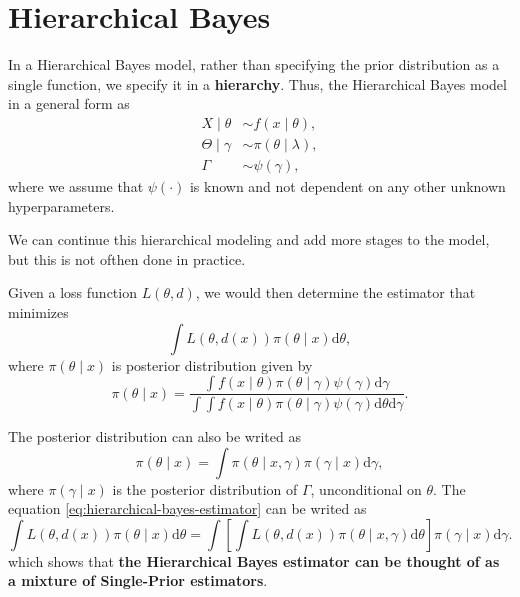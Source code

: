 \section{Hierarchical Bayes}

In a Hierarchical Bayes model, rather than specifying the prior distribution as a single function, we specify it in a \textbf{hierarchy}. Thus, the Hierarchical Bayes model in a general form as
\begin{equation}
    \begin{aligned}
        X\mid\theta      & \sim f\left(x\mid\theta\right),         \\
        \Theta\mid\gamma & \sim \pi\left(\theta\mid\lambda\right), \\
        \Gamma           & \sim \psi\left(\gamma\right),
    \end{aligned}
    \label{eq:hierarchical-bayes}
\end{equation}
where we assume that $\psi\left(\cdot\right)$ is known and not dependent on any other unknown hyperparameters.

\begin{remark}
    We can continue this hierarchical modeling and add more stages to the model, but this is not ofthen done in practice.
\end{remark}

Given a loss function $L\left(\theta,d\right)$, we would then determine the estimator that minimizes
\begin{equation} \label{eq:hierarchical-bayes-estimator}
    \int L\left(\theta,d\left(x\right)\right)\pi\left(\theta\mid x\right)\mathrm{d}\theta,
\end{equation}
where $\pi\left(\theta\mid x\right)$ is posterior distribution given by
\begin{equation*}
    \pi\left(\theta\mid x\right)=\frac{\int f\left(x\mid\theta\right)\pi\left(\theta\mid\gamma\right)\psi\left(\gamma\right)\mathrm{d}\gamma}{\int\int f\left(x\mid\theta\right)\pi\left(\theta\mid\gamma\right)\psi\left(\gamma\right)\mathrm{d}\theta\mathrm{d}\gamma}.
\end{equation*}

\begin{remark}
    The posterior distribution can also be writed as
    \begin{equation*}
        \pi\left(\theta\mid x\right)=\int\pi\left(\theta\mid x,\gamma\right)\pi\left(\gamma\mid x\right)\mathrm{d}\gamma,
    \end{equation*}
    where $\pi\left(\gamma\mid x\right)$ is the posterior distribution of $\Gamma$, unconditional on $\theta$. The equation \ref{eq:hierarchical-bayes-estimator} can be writed as
    \begin{equation*}
        \int L\left(\theta,d\left(x\right)\right)\pi\left(\theta\mid x\right)\mathrm{d}\theta = \int\left[\int L\left(\theta,d\left(x\right)\right)\pi\left(\theta\mid x,\gamma\right)\mathrm{d}\theta\right]\pi\left(\gamma\mid x\right)\mathrm{d}\gamma.
    \end{equation*}
    which shows that \textbf{the Hierarchical Bayes estimator can be thought of as a mixture of Single-Prior estimators}.
\end{remark}

